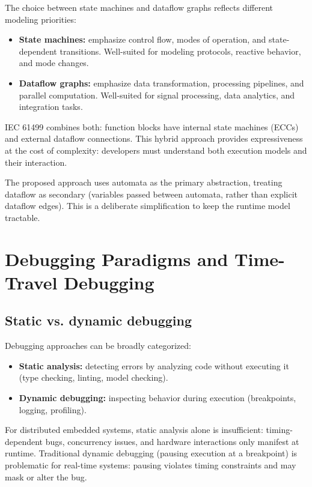 The choice between state machines and dataflow graphs reflects different modeling priorities:
\begin{itemize}
  \item \textbf{State machines:} emphasize control flow, modes of operation, and state-dependent transitions. Well-suited for modeling protocols, reactive behavior, and mode changes.
  \item \textbf{Dataflow graphs:} emphasize data transformation, processing pipelines, and parallel computation. Well-suited for signal processing, data analytics, and integration tasks.
\end{itemize}

IEC 61499 combines both: function blocks have internal state machines (ECCs) and external dataflow connections.
This hybrid approach provides expressiveness at the cost of complexity: developers must understand both execution models and their interaction.

The proposed approach uses automata as the primary abstraction, treating dataflow as secondary (variables passed between automata, rather than explicit dataflow edges).
This is a deliberate simplification to keep the runtime model tractable.

\section{Debugging Paradigms and Time-Travel Debugging}

\subsection{Static vs. dynamic debugging}

Debugging approaches can be broadly categorized:
\begin{itemize}
  \item \textbf{Static analysis:} detecting errors by analyzing code without executing it (type checking, linting, model checking).
  \item \textbf{Dynamic debugging:} inspecting behavior during execution (breakpoints, logging, profiling).
\end{itemize}

For distributed embedded systems, static analysis alone is insufficient: timing-dependent bugs, concurrency issues, and hardware interactions only manifest at runtime.
Traditional dynamic debugging (pausing execution at a breakpoint) is problematic for real-time systems: pausing violates timing constraints and may mask or alter the bug.

